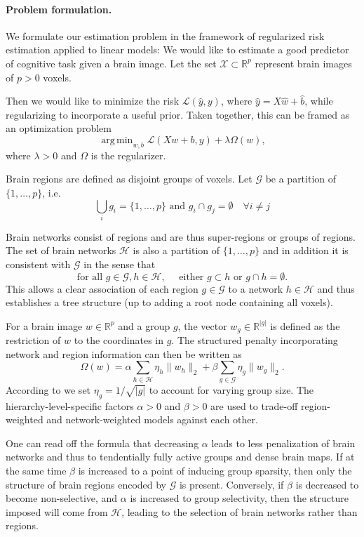 \documentclass{article}
\DeclareMathOperator*{\argmin}{arg\,min}
\newcommand{\R}{\mathbb{R}}
\begin{document}


\paragraph{Problem formulation.}
We formulate our estimation problem in the framework of regularized risk
estimation applied to linear models: 
We would like to estimate a good predictor of cognitive task
given a brain image. Let the set \(\mathcal X\subset\R^p\) represent brain
images of \(p > 0\) voxels.

Then we would like to minimize the risk \(\mathcal L(\hat y, y)\), where
\(\hat y = X\hat w + \hat b\), while regularizing to incorporate a useful
prior. Taken together, this can be framed as an optimization problem
\[\argmin_{w, b} \mathcal L(Xw + b, y) + \lambda\Omega(w),\]
where \(\lambda > 0\) and \(\Omega\) is the regularizer.

Brain regions are defined as disjoint groups of voxels. Let \(\mathcal G\)
be a partition of \(\{1, \dots, p\}\), i.e.
\[  \bigcup_{i} g_i = \{1, \dots, p\} \textrm{ and } g_i\cap g_j=\emptyset
\quad\forall i\not=j\]

Brain networks consist of regions and are thus super-regions or groups of 
regions. The set of brain networks \(\mathcal{H}\) is also a partition of 
\(\{1, \dots, p\}\) and in addition it is consistent with \(\mathcal G\) in
the sense that
\[\textrm{for all }g\in\mathcal G, h\in\mathcal H,\quad
\textrm{ either } g\subset h\textrm{ or }g\cap h = \emptyset.\]
This allows a clear association of each region \(g\in\mathcal G\) to a 
network \(h\in\mathcal H\) and thus establishes a tree structure (up to 
adding a root node containing all voxels).

For a brain image \(w\in\R^p\) and a group \(g\), the vector 
\(w_g\in\R^{|g|}\) is defined as the restriction of \(w\) to the coordinates
 in \(g\). The structured penalty incorporating network
and region information can then be written as
\[\Omega(w) = \alpha\sum_{h\in\mathcal H}\eta_h\|w_h\|_2 + \beta\sum_{g\in\mathcal G}\eta_g\|w_g\|_2.\]
According to \cite{yuan2006model} we set \(\eta_g = 1/\sqrt{|g|}\) to
account for varying group size. The hierarchy-level-specific factors 
\(\alpha > 0\) and \(\beta > 0\) are used to trade-off region-weighted and
network-weighted models against each other.

One can read off the formula that decreasing \(\alpha\) leads to less 
penalization of brain networks and thus to tendentially fully active groups
and dense brain maps. If at the same time \(\beta\) is increased to a point
of inducing group sparsity, then only the structure of brain regions encoded
by \(\mathcal G\) is present. Conversely, if \(\beta\) is decreased to 
become non-selective, and \(\alpha\) is increased to group selectivity,
then the structure imposed will come from \(\mathcal H\), leading to the
selection of brain networks rather than regions.
\end{document}
